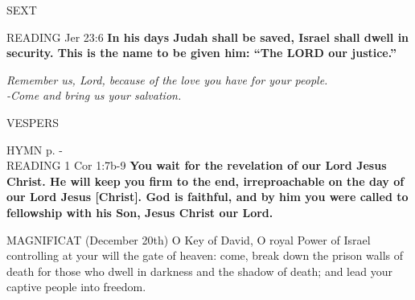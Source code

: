 \begin{flushleft}\normalsize{\uppercase{Sext\\}}\end{flushleft}
\noindent\small{\uppercase{Reading}} Jer 23:6 \textbf{ In his days Judah shall be saved, Israel shall dwell in security. This is the name to be given him: “The LORD our justice.”\\}
\begin{center}\textit{Remember us, Lord, because of the love you have for your people.\\
-Come and bring us your salvation.}\end{center}

\begin{flushleft}\normalsize{\uppercase{Vespers\\}}\end{flushleft}
\small{\uppercase{Hymn} p. \pageref{advent:firstHymn}-\pageref{advent:lastHymn}}\\
\noindent\small{\uppercase{Reading}} 1 Cor 1:7b-9 \textbf{ You wait for the revelation of our Lord Jesus Christ. He will keep you firm to the end, irreproachable on the day of our Lord Jesus [Christ]. God is faithful, and by him you were called to fellowship with his Son, Jesus Christ our Lord.\\}

\noindent\small{\uppercase{Magnificat}} (December 20th)
O Key of David, O royal Power of Israel controlling at your will the gate of heaven: come, break down the prison walls of death for those who dwell in darkness and the shadow of death; and lead your captive people into freedom.
